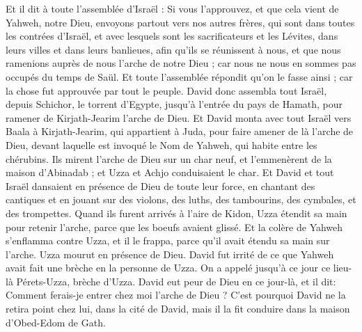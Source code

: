 \begin{multicols}{2}
Et il dit à toute l'assemblée d'Israël : Si vous l'approuvez, et que cela vient de Yahweh, notre Dieu, envoyons partout vers nos autres frères, qui sont dans toutes les contrées d'Israël, et avec lesquels sont les sacrificateurs et les Lévites, dans leurs villes et dans leurs banlieues, afin qu'ils se réunissent à nous,
et que nous ramenions auprès de nous l’arche de notre Dieu ; car nous ne nous en sommes pas occupés du temps de Saül.
Et toute l'assemblée répondit qu'on le fasse ainsi ; car la chose fut approuvée par tout le peuple.
David donc assembla tout Israël, depuis Schichor, le torrent d'Egypte, jusqu'à l'entrée du pays de Hamath, pour ramener de Kirjath-Jearim l’arche de Dieu.
Et David monta avec tout Israël vers Baala à Kirjath-Jearim, qui appartient à Juda, pour faire amener de là l’arche de Dieu, devant laquelle est invoqué le Nom de Yahweh, qui habite entre les chérubins.
Ils mirent l’arche de Dieu sur un char neuf, et l'emmenèrent de la maison d'Abinadab ; et Uzza et Achjo conduisaient le char.
Et David et tout Israël dansaient en présence de Dieu de toute leur force, en chantant des cantiques et en jouant sur des violons, des luths, des tambourins, des cymbales, et des trompettes.
Quand ils furent arrivés à l'aire de Kidon, Uzza  étendit sa main pour retenir l’arche, parce que les boeufs avaient glissé.
Et la colère de Yahweh s'enflamma contre Uzza, et il le frappa, parce qu'il avait étendu sa main sur l’arche. Uzza mourut en présence de Dieu.
David fut irrité de ce que Yahweh avait fait une brèche en la personne de Uzza. On a appelé jusqu'à ce jour ce lieu-là Pérets-Uzza, brèche d'Uzza.
David eut peur de Dieu en ce jour-là, et il dit: Comment ferais-je entrer chez moi l’arche de Dieu ?
C'est pourquoi David ne la retira point chez lui, dans la cité de David, mais il la fit conduire dans la maison d'Obed-Edom de Gath.

\end{multicols}
